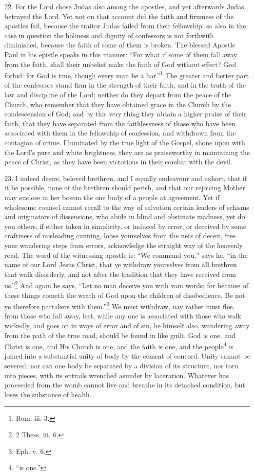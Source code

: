 22. For the Lord chose Judas also among the apostles, and yet afterwards Judas betrayed the Lord. Yet not on that account did the faith and firmness of the apostles fail, because the traitor Judas failed from their fellowship: so also in the case in question the holiness and dignity of confessors is not forthwith diminished, because the faith of some of them is broken. The blessed Apostle Paul in his epistle speaks in this manner: “For what if some of them fall away from the faith, shall their unbelief make the faith of God without effect? God forbid: for God is true, though every man be a liar.”\footnote{Rom. iii. 3.} The greater and better part of the confessors stand firm in the strength of their faith, and in the truth of the law and discipline of the Lord; neither do they depart from the peace of the Church, who remember that they have obtained grace in the Church by the condescension of God; and by this very thing they obtain a higher praise of their faith, that they have separated from the faithlessness of those who have been associated with them in the fellowship of confession, and withdrawn from the contagion of crime. Illuminated by the true light of the Gospel, shone upon with the Lord’s pure and white brightness, they are as praiseworthy in maintaining the peace of Christ, as they have been victorious in their combat with the devil.

23. I indeed desire, beloved brethren, and I equally endeavour and exhort, that if it be possible, none of the brethren should perish, and that our rejoicing Mother may enclose in her bosom the one body of a people at agreement. Yet if wholesome counsel cannot recall to the way of salvation certain leaders of schisms and originators of dissensions, who abide in blind and obstinate madness, yet do you others, if either taken in simplicity, or induced by error, or deceived by some craftiness of misleading cunning, loose yourselves from the nets of deceit, free your wandering steps from errors, acknowledge the straight way of the heavenly road. The word of the witnessing apostle is: “We command you,” says he, “in the name of our Lord Jesus Christ, that ye withdraw yourselves from all brethren that walk disorderly, and not after the tradition that they have received from us.”\footnote{2 Thess. iii. 6.} And again he says, “Let no man deceive you with vain words; for because of these things cometh the wrath of God upon the children of disobedience. Be not ye therefore partakers with them.”\footnote{Eph. v. 6.} We must withdraw, nay rather must flee, from those who fall away, lest, while any one is associated with those who walk wickedly, and goes on in ways of error and of sin, he himself also, wandering away from the path of the true road, should be found in like guilt. God is one, and Christ is one, and His Church is one, and the faith is one, and the people\footnote{“is one.”} is joined into a substantial unity of body by the cement of concord. Unity cannot be severed; nor can one body be separated by a division of its structure, nor torn into pieces, with its entrails wrenched asunder by laceration. Whatever has proceeded from the womb cannot live and breathe in its detached condition, but loses the substance of health.


